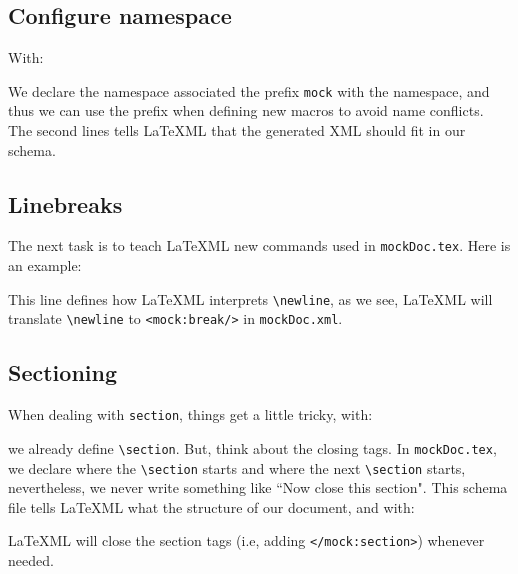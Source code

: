 \documentclass[a4paper]{article}
\def\latexml{{\LaTeX}ML\xspace}
\begin{document}
\subsection{Configure namespace}
 With:
 
 We declare the namespace associated the prefix \lstinline|mock| with the
 namespace, and thus we can use the prefix when defining new macros to avoid 
 name conflicts. The second lines tells \latexml that the generated XML should fit in our
 schema.

\subsection{Linebreaks}
The next task is to teach \latexml new commands used in \lstinline|mockDoc.tex|. Here is
an example:
 

This line defines how \latexml interprets \lstinline|\newline|, as we see,
\latexml will translate \lstinline|\newline| to \lstinline|<mock:break/>| in
\lstinline|mockDoc.xml|.

\subsection{Sectioning}
 When dealing with \lstinline|section|, things get a little tricky, with:
  
we already define \lstinline|\section|. But, think about the closing tags. In \lstinline|mockDoc.tex|, we declare where the \lstinline|\section| starts and where the next \lstinline|\section| starts, nevertheless, we never write something like ``Now close this section". This schema file tells \latexml what the structure of our document, and with:
 
\latexml will close the section tags (i.e, adding \lstinline|</mock:section>|) whenever needed.
\end{document}

